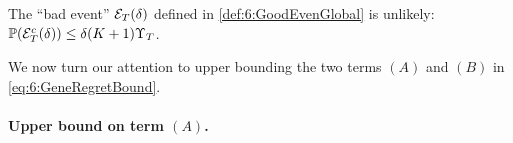 \begin{lemma}\label{lem:6:GoodEventGlobal}
\begin{leftbar}[lemmabar]  %
    The ``bad event''  $\mathcal{E}_T(\delta)$ defined in \eqref{def:6:GoodEvenGlobal} is unlikely:
        $\mathbb{P}(\mathcal{E}_T^c(\delta)) \leq \delta(K+1)\Upsilon_T$.
\end{leftbar}  %
\end{lemma}

We now turn our attention to upper bounding the two terms $(A)$ and $(B)$ in \eqref{eq:6:GeneRegretBound}.



\paragraph{Upper bound on term $(A)$.}

